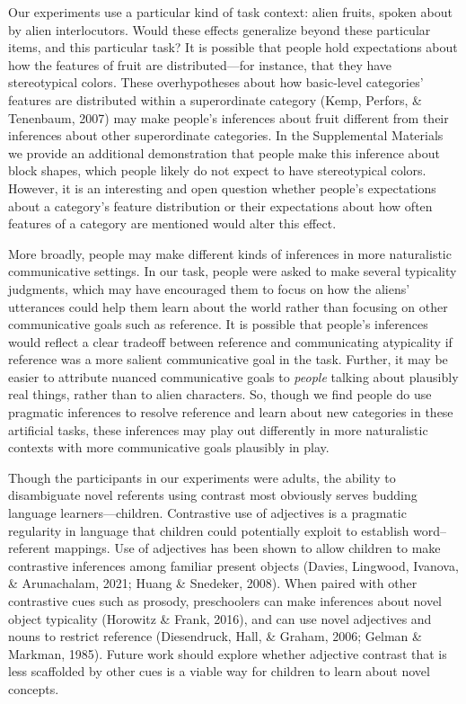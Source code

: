 \documentclass[
  english,
  man,floatsintext]{apa6}
\begin{document}
Our experiments use a particular kind of task context: alien fruits, spoken about by alien interlocutors. Would these effects generalize beyond these particular items, and this particular task? It is possible that people hold expectations about how the features of fruit are distributed---for instance, that they have stereotypical colors. These overhypotheses about how basic-level categories' features are distributed within a superordinate category (Kemp, Perfors, \& Tenenbaum, 2007) may make people's inferences about fruit different from their inferences about other superordinate categories. In the Supplemental Materials we provide an additional demonstration that people make this inference about block shapes, which people likely do not expect to have stereotypical colors. However, it is an interesting and open question whether people's expectations about a category's feature distribution or their expectations about how often features of a category are mentioned would alter this effect.

More broadly, people may make different kinds of inferences in more naturalistic communicative settings. In our task, people were asked to make several typicality judgments, which may have encouraged them to focus on how the aliens' utterances could help them learn about the world rather than focusing on other communicative goals such as reference. It is possible that people's inferences would reflect a clear tradeoff between reference and communicating atypicality if reference was a more salient communicative goal in the task. Further, it may be easier to attribute nuanced communicative goals to \emph{people} talking about plausibly real things, rather than to alien characters. So, though we find people do use pragmatic inferences to resolve reference and learn about new categories in these artificial tasks, these inferences may play out differently in more naturalistic contexts with more communicative goals plausibly in play.

Though the participants in our experiments were adults, the ability to disambiguate novel referents using contrast most obviously serves budding language learners---children. Contrastive use of adjectives is a pragmatic regularity in language that children could potentially exploit to establish word--referent mappings. Use of adjectives has been shown to allow children to make contrastive inferences among familiar present objects (Davies, Lingwood, Ivanova, \& Arunachalam, 2021; Huang \& Snedeker, 2008). When paired with other contrastive cues such as prosody, preschoolers can make inferences about novel object typicality (Horowitz \& Frank, 2016), and can use novel adjectives and nouns to restrict reference (Diesendruck, Hall, \& Graham, 2006; Gelman \& Markman, 1985). Future work should explore whether adjective contrast that is less scaffolded by other cues is a viable way for children to learn about novel concepts.
\end{document}
